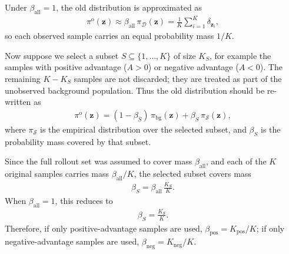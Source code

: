 \documentclass{article} %
\begin{document}
Under $\beta_{\mathrm{all}}=1$, the old distribution is approximated as
\begin{align}
\pi^{\mathrm{o}}(\mathbf z)
\approx
\beta_{\mathrm{all}}\,\pi_{\mathcal{D}}(\mathbf z)
=
\frac{1}{K}\sum_{i=1}^{K}\delta_{\mathbf z_i},
\end{align}
so each observed sample carries an equal probability mass
$1/K$.

Now suppose we select a subset $S\subseteq\{1,\dots,K\}$ of size
$K_S$, for example the samples with positive advantage ($A>0$) or
negative advantage ($A<0$). The remaining $K-K_S$ samples are not
discarded; they are treated as part of the unobserved background
population. Thus the old distribution should be re-written as
\begin{align}
\pi^{\mathrm{o}}(\mathbf z)
=
(1-\beta_S)\,\pi_{\mathrm{bg}}(\mathbf z)
+
\beta_S\,\pi_{\mathcal{S}}(\mathbf z),
\end{align}
where $\pi_{\mathcal{S}}$ is the empirical distribution over the
selected subset, and $\beta_S$ is the probability mass covered by that
subset.

Since the full rollout set was assumed to cover mass
$\beta_{\mathrm{all}}$, and each of the $K$ original samples carries
mass $\beta_{\mathrm{all}}/K$, the selected subset covers mass
\begin{align}
\beta_S
=
\beta_{\mathrm{all}}\,\frac{K_S}{K}.
\end{align}
When $\beta_{\mathrm{all}}=1$, this reduces to
\begin{align}
\boxed{
\beta_S
=
\frac{K_S}{K}
}.
\end{align}
Therefore, if only positive-advantage samples are used,
$\beta_{\mathrm{pos}}=K_{\mathrm{pos}}/K$; if only negative-advantage
samples are used, $\beta_{\mathrm{neg}}=K_{\mathrm{neg}}/K$.
\end{document}

